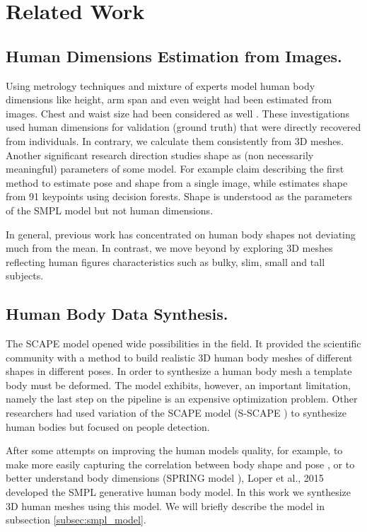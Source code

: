 \documentclass[runningheads, orivec]{llncs}
\begin{document}
\section{Related Work} \label{sec:related_work}

\subsection{Human Dimensions Estimation from Images.}
Using metrology techniques \cite{ams.2008.BenAbdelkaderY08} and mixture of experts model \cite{Sigal.2008} human body dimensions like height, arm span and even weight had been estimated from images. Chest and waist size had been considered as well \cite{Guan.2013}. These investigations used human dimensions for validation (ground truth) that were directly recovered from individuals. In contrary, we calculate them  
consistently from 3D meshes.
Another significant research direction studies shape as (non necessarily meaningful) parameters of some model. For example \cite{Bogo:ECCV:2016} claim describing the first method 
to 
estimate pose and shape from a single image, while \cite{DBLP:Lassner2017} estimates shape from 91 keypoints using decision 
forests. Shape is understood as the 
parameters of the SMPL model but not human dimensions.

In general, previous work has concentrated on human body shapes not deviating 
much from the mean. In contrast, we move beyond by exploring 3D meshes 
reflecting human figures characteristics such as bulky, slim, small and 
tall subjects.

\subsection{Human Body Data Synthesis.}
The SCAPE model\cite{Anguelov.2005} opened wide possibilities in the field. It 
provided the scientific community with a method to build realistic 3D human 
body meshes of different shapes in different poses. In order to synthesize a 
human body mesh a template body must be deformed. The model exhibits, however, an important limitation, namely the last 
step on the pipeline is an expensive optimization problem. Other researchers had used variation of the SCAPE model (S-SCAPE \cite{Pishchulin.2017}) to synthesize human bodies but focused on people detection.

After some attempts on improving the human models quality, for example, to make 
more 
easily capturing the correlation between body shape and pose 
\cite{HaslerSSRS09}, or to better understand body dimensions (SPRING model 
\cite{Yang.2014}), Loper et al., 2015 \cite{Loper.2015} developed the SMPL generative 
human body model. In this work we synthesize 3D human meshes using this 
model. We will briefly describe the model in subsection \ref{subsec:smpl_model}.
\end{document}
